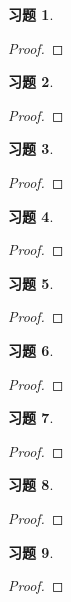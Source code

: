 \documentclass{ctexart}
\newtheorem{problem}{习题}[section]
\begin{document}
\begin{problem}
\end{problem}
\begin{proof}

\end{proof}

\setcounter{problem}{13}
\begin{problem}
\end{problem}
\begin{proof}

\end{proof}

\begin{problem}
\end{problem}
\begin{proof}

\end{proof}

\setcounter{problem}{20}
\begin{problem}
\end{problem}
\begin{proof}

\end{proof}

\begin{problem}
\end{problem}
\begin{proof}

\end{proof}

\setcounter{problem}{25}
\begin{problem}
\end{problem}
\begin{proof}

\end{proof}

\setcounter{problem}{27}
\begin{problem}
\end{problem}
\begin{proof}

\end{proof}

\begin{problem}
\end{problem}
\begin{proof}

\end{proof}

\begin{problem}
\end{problem}
\begin{proof}

\end{proof}
\end{document}
